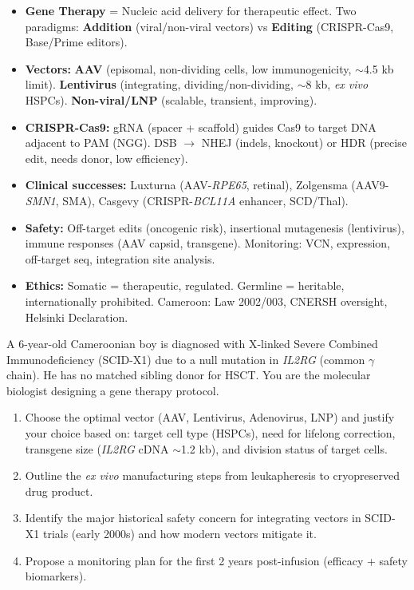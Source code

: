 \documentclass[11pt]{article}
\begin{document}
\begin{aretenir}
\begin{itemize}
\item \textbf{Gene Therapy} = Nucleic acid delivery for therapeutic effect. Two paradigms: \textbf{Addition} (viral/non-viral vectors) vs \textbf{Editing} (CRISPR-Cas9, Base/Prime editors).
\item \textbf{Vectors:} \textbf{AAV} (episomal, non-dividing cells, low immunogenicity, $\sim$4.5 kb limit). \textbf{Lentivirus} (integrating, dividing/non-dividing, $\sim$8 kb, \emph{ex vivo} HSPCs). \textbf{Non-viral/LNP} (scalable, transient, improving).
\item \textbf{CRISPR-Cas9:} gRNA (spacer + scaffold) guides Cas9 to target DNA adjacent to PAM (NGG). DSB $\rightarrow$ NHEJ (indels, knockout) or HDR (precise edit, needs donor, low efficiency).
\item \textbf{Clinical successes:} Luxturna (AAV-\emph{RPE65}, retinal), Zolgensma (AAV9-\emph{SMN1}, SMA), Casgevy (CRISPR-\emph{BCL11A} enhancer, SCD/Thal).
\item \textbf{Safety:} Off-target edits (oncogenic risk), insertional mutagenesis (lentivirus), immune responses (AAV capsid, transgene). Monitoring: VCN, expression, off-target seq, integration site analysis.
\item \textbf{Ethics:} Somatic = therapeutic, regulated. Germline = heritable, internationally prohibited. Cameroon: Law 2002/003, CNERSH oversight, Helsinki Declaration.
\end{itemize}
\end{aretenir}

\begin{exercice}
A 6-year-old Cameroonian boy is diagnosed with X-linked Severe Combined Immunodeficiency (SCID-X1) due to a null mutation in \emph{IL2RG} (common $\gamma$ chain). He has no matched sibling donor for HSCT. You are the molecular biologist designing a gene therapy protocol.
\begin{enumerate}
    \item Choose the optimal vector (AAV, Lentivirus, Adenovirus, LNP) and justify your choice based on: target cell type (HSPCs), need for lifelong correction, transgene size (\emph{IL2RG} cDNA $\sim$1.2 kb), and division status of target cells.
    \item Outline the \emph{ex vivo} manufacturing steps from leukapheresis to cryopreserved drug product.
    \item Identify the major historical safety concern for integrating vectors in SCID-X1 trials (early 2000s) and how modern vectors mitigate it.
    \item Propose a monitoring plan for the first 2 years post-infusion (efficacy + safety biomarkers).
\end{enumerate}
\end{exercice}
\end{document}
